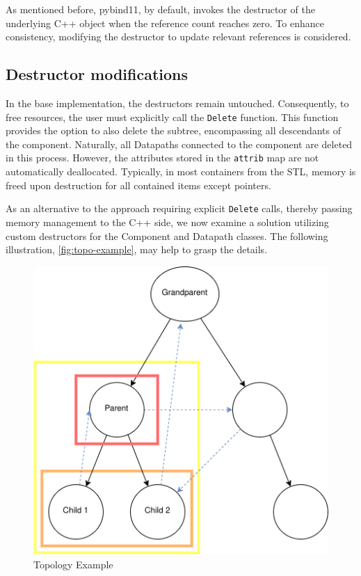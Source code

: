 \smallskip
As mentioned before, pybind11, by default, invokes the destructor of the underlying C++ object when the reference count reaches zero. To enhance consistency, modifying the destructor to update relevant references is considered. 

\subsection{Destructor modifications}

In the base implementation, the destructors remain untouched. Consequently, to free resources, the user must explicitly call the \verb|Delete| function. This function provides the option to also delete the subtree, encompassing all descendants of the component. Naturally, all Datapaths connected to the component are deleted in this process. However, the attributes stored in the \verb|attrib| map are not automatically deallocated. Typically, in most containers from the \ac{STL}, memory is freed upon destruction for all contained items except pointers.\cite{cppreference-map-destructor}

As an alternative to the approach requiring explicit \verb|Delete| calls, thereby passing memory management to the C++ side, we now examine a solution utilizing custom destructors for the Component and Datapath classes. The following illustration, \autoref{fig:topo-example}, may help to grasp the details.
\begin{figure}[htpb]
    \centering
    \includegraphics[scale=0.5]{figures/Topo-example.png}
    \caption{Topology Example}
    \label{fig:topo-example}
\end{figure}

